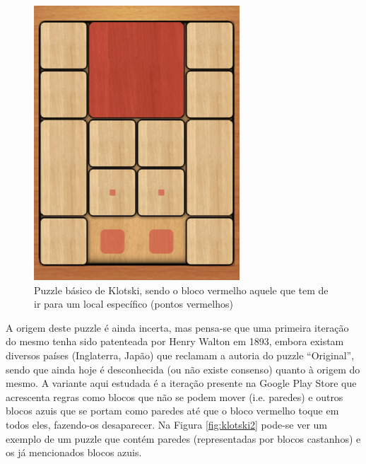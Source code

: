 \documentclass[conference]{IEEEtran}
\begin{document}
\begin{figure}
	\centering
	\includegraphics[width=0.75\linewidth]{klotski1.png}
	\caption{Puzzle básico de Klotski, sendo o bloco vermelho aquele que tem de ir para um local específico (pontos vermelhos)}
	\label{fig:klotski1}
\end{figure}

A origem deste puzzle é ainda incerta, mas pensa-se que uma primeira iteração do mesmo tenha sido patenteada por Henry Walton em 1893, embora existam diversos países (Inglaterra, Japão) que reclamam a autoria do puzzle “Original”, sendo que ainda hoje é desconhecida (ou não existe consenso) quanto à origem do mesmo. \cite{b2}
A variante aqui estudada é a iteração presente na Google Play Store \cite{b1} que acrescenta regras como blocos que não se podem mover (i.e. paredes) e outros blocos azuis que se portam como paredes até que o bloco vermelho toque em todos eles, fazendo-os desaparecer. Na Figura \ref{fig:klotski2} pode-se ver um exemplo de um puzzle que contém paredes (representadas por blocos castanhos) e os já mencionados blocos azuis.
\end{document}

